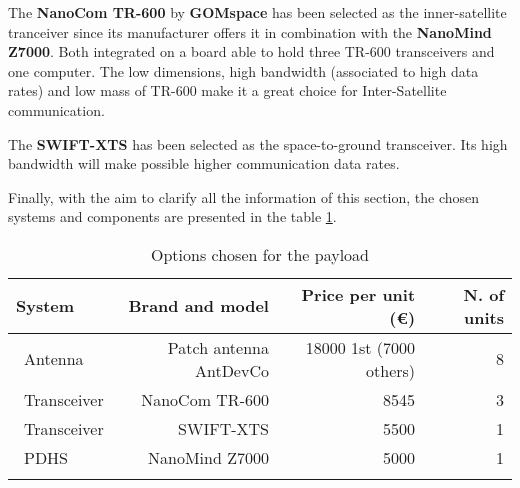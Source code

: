 The \textbf{NanoCom TR-600} by \textbf{GOMspace} has been selected as the inner-satellite tranceiver since its manufacturer offers it in combination with the \textbf{NanoMind Z7000}. Both integrated on a board able to hold three TR-600 transceivers and one computer. The low dimensions, high bandwidth (associated to high data rates) and low mass of TR-600 make it a great choice for Inter-Satellite communication.

The \textbf{SWIFT-XTS} has been selected as the space-to-ground transceiver. Its high bandwidth will make possible higher communication data rates.


Finally, with the aim to clarify all the information of this section, the chosen systems and components are presented in the table \ref{payloadchosen}.

\begin{longtable}{| l | r | r | r |}
	\hline
	\rowcolor[gray]{0.80}	\textbf{System} &  \textbf{Brand and model}     & \textbf{Price per unit (\euro)} & \textbf{N. of units}  \\
	\hline
	\endfirsthead
	
	~Antenna & Patch antenna AntDevCo & 18000 1st (7000 others) & 8 \\
	~Transceiver & NanoCom TR-600 & 8545 & 3 \\
	~Transceiver & SWIFT-XTS & 5500 &1\\
	~PDHS & NanoMind Z7000 & 5000 & 1 \\
	\hline
	
\caption{Options chosen for the payload}
\label{payloadchosen}
\end{longtable}